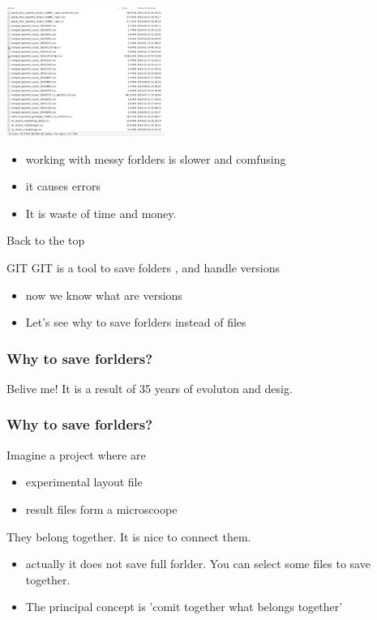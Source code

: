 \documentclass[aspectratio=169]{beamer}
\begin{document}
\begin{frame}
\includegraphics[height=120pt]{pictures/Screenshot_2020-02-25_17-47-03-ugly_folder.png}

\begin{itemize}
		\item working with messy forlders is slower and comfusing
		\item it causes errors
		\item It is waste of time and money.
	\end{itemize}

\end{frame}


\begin{frame}

  Back to the top
  
	\begin{block}{GIT}
		GIT is a  tool to save folders , and handle versions
	\end{block}
  
	\begin{itemize}
  		\item now we know what are versions
		\item Let's see why to save forlders instead of files
	\end{itemize}

\end{frame}


\begin{frame}
\frametitle<presentation>{Why to save forlders?}

Belive me! It is a result of 35 years of evoluton and desig. 

\end{frame}

\begin{frame}
\frametitle<presentation>{Why to save forlders?}

Imagine a project where are 
\begin{itemize}
  		\item experimental layout file
		\item result files form a microscoope
\end{itemize}
\pause
They belong together. It is nice to connect them.
\pause
\begin{itemize}
  		\item actually it does not save full forlder. You can select some files to save together.
		\item The principal concept is 'comit together what belongs together'
\end{itemize}


\end{frame}
\end{document}
